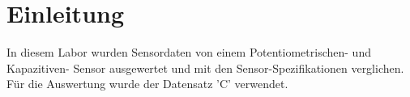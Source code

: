 \section{Einleitung}
In diesem Labor wurden Sensordaten von einem Potentiometrischen- und Kapazitiven-
Sensor ausgewertet und mit den Sensor-Spezifikationen verglichen.\\
Für die Auswertung wurde der Datensatz 'C' verwendet.